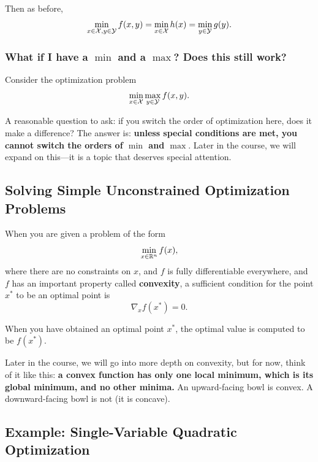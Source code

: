 \documentclass[12pt]{article}
\begin{document}
Then as before,
%
\begin{equation*}
\min_{x\in{\mathcal X}, y\in{\mathcal Y}} f(x,y) = \min_{x \in {\mathcal X}} h(x) = \min_{y \in {\mathcal Y}} g(y).
\end{equation*}

\subsubsection{What if I have a $\min$ and a $\max$? Does this still work?}

Consider the optimization problem
%
\begin{equation*}
\min_{x\in{\mathcal X}} \max_{y \in {\mathcal Y}} f(x,y).
\end{equation*}

A reasonable question to ask: if you switch the order of optimization here, does it make a difference? The answer is: \textbf{unless special conditions are met, you cannot switch the orders of $\min$ and $\max$}. Later in the course, we will expand on this---it is a topic that deserves special attention.


\subsection{Solving Simple Unconstrained Optimization Problems}

When you are given a problem of the form
%
\begin{equation*}
\min_{x \in { {\mathbb R}^{n} }} f(x),
\end{equation*}
%
where there are no constraints on $x$, and $f$ is fully differentiable everywhere, and $f$ has an important property called \textbf{convexity}, a sufficient condition for the point $x^*$ to be an optimal point is
%
\begin{equation*}
\nabla_x f(x^*) = 0.
\end{equation*}

When you have obtained an optimal point $x^*$, the optimal value is computed to be $f(x^*)$. 


Later in the course, we will go into more depth on convexity, but for now, think of it like this: \textbf{a convex function has only one local minimum, which is its global minimum, and no other minima.} An upward-facing bowl is convex. A downward-facing bowl is not (it is concave). 

\subsection{Example: Single-Variable Quadratic Optimization}
\end{document}
